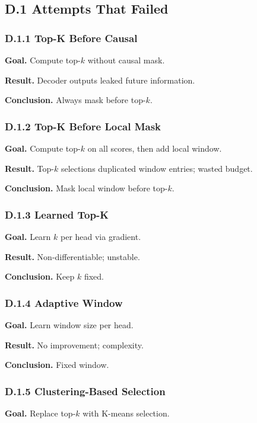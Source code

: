 \subsection{D.1 Attempts That Failed}

\subsubsection{D.1.1 Top-K Before Causal}

\textbf{Goal.} Compute top-$k$ without causal mask.

\textbf{Result.} Decoder outputs leaked future information.

\textbf{Conclusion.} Always mask before top-$k$.

\subsubsection{D.1.2 Top-K Before Local Mask}

\textbf{Goal.} Compute top-$k$ on all scores, then add local window.

\textbf{Result.} Top-$k$ selections duplicated window entries; wasted budget.

\textbf{Conclusion.} Mask local window before top-$k$.

\subsubsection{D.1.3 Learned Top-K}

\textbf{Goal.} Learn $k$ per head via gradient.

\textbf{Result.} Non-differentiable; unstable.

\textbf{Conclusion.} Keep $k$ fixed.

\subsubsection{D.1.4 Adaptive Window}

\textbf{Goal.} Learn window size per head.

\textbf{Result.} No improvement; complexity.

\textbf{Conclusion.} Fixed window.

\subsubsection{D.1.5 Clustering-Based Selection}

\textbf{Goal.} Replace top-$k$ with K-means selection.

